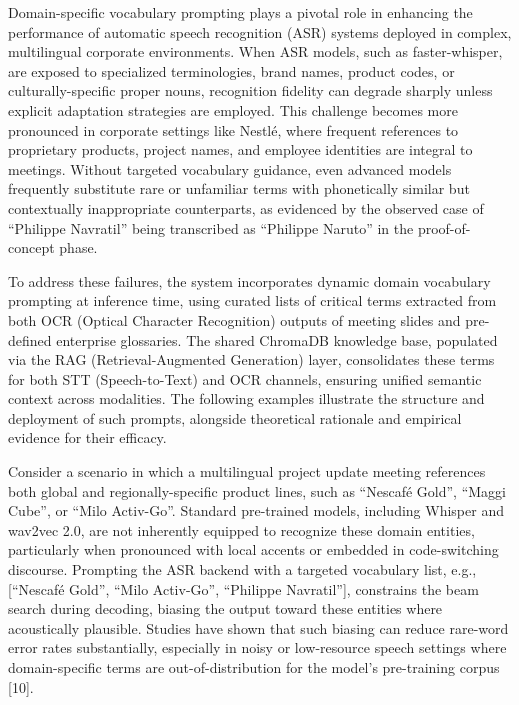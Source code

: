 \documentclass[12pt,a4paper]{article}
\begin{document}
Domain-specific vocabulary prompting plays a pivotal role in enhancing the performance of automatic speech recognition (ASR) systems deployed in complex, multilingual corporate environments. When ASR models, such as faster-whisper, are exposed to specialized terminologies, brand names, product codes, or culturally-specific proper nouns, recognition fidelity can degrade sharply unless explicit adaptation strategies are employed. This challenge becomes more pronounced in corporate settings like Nestlé, where frequent references to proprietary products, project names, and employee identities are integral to meetings. Without targeted vocabulary guidance, even advanced models frequently substitute rare or unfamiliar terms with phonetically similar but contextually inappropriate counterparts, as evidenced by the observed case of “Philippe Navratil” being transcribed as “Philippe Naruto” in the proof-of-concept phase.


To address these failures, the system incorporates dynamic domain vocabulary prompting at inference time, using curated lists of critical terms extracted from both OCR (Optical Character Recognition) outputs of meeting slides and pre-defined enterprise glossaries. The shared ChromaDB knowledge base, populated via the RAG (Retrieval-Augmented Generation) layer, consolidates these terms for both STT (Speech-to-Text) and OCR channels, ensuring unified semantic context across modalities. The following examples illustrate the structure and deployment of such prompts, alongside theoretical rationale and empirical evidence for their efficacy.


Consider a scenario in which a multilingual project update meeting references both global and regionally-specific product lines, such as “Nescafé Gold”, “Maggi Cube”, or “Milo Activ-Go”. Standard pre-trained models, including Whisper and wav2vec 2.0, are not inherently equipped to recognize these domain entities, particularly when pronounced with local accents or embedded in code-switching discourse. Prompting the ASR backend with a targeted vocabulary list, e.g., [“Nescafé Gold”, “Milo Activ-Go”, “Philippe Navratil”], constrains the beam search during decoding, biasing the output toward these entities where acoustically plausible. Studies have shown that such biasing can reduce rare-word error rates substantially, especially in noisy or low-resource speech settings where domain-specific terms are out-of-distribution for the model’s pre-training corpus [10].
\end{document}
